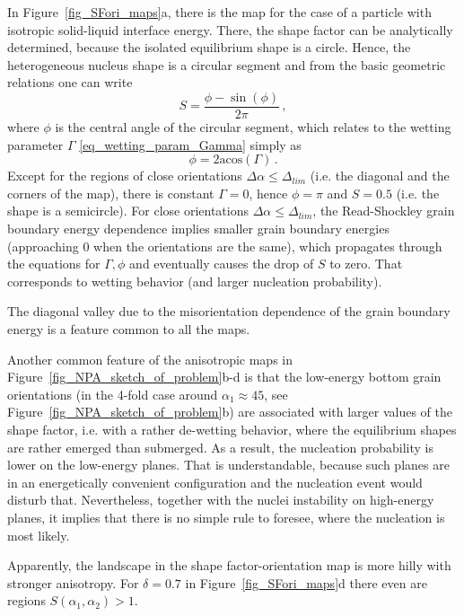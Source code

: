 	In Figure~\ref{fig_SFori_maps}a, there is the map for the case of a particle with isotropic solid-liquid interface energy. There, the shape factor can be analytically determined, because the isolated equilibrium shape is a circle. Hence, the heterogeneous nucleus shape is a circular segment and from the basic geometric relations one can write
	\begin{equation}
		S = \frac{\phi-\sin(\phi)}{2\pi} \,,
	\end{equation}
	where $\phi$ is the central angle of the circular segment, which relates to the wetting parameter $\Gamma$ \eqref{eq_wetting_param_Gamma} simply as
	\begin{equation}
		\phi = 2\mathrm{acos}(\Gamma) \,.
	\end{equation}
	Except for the regions of close orientations $\Delta\alpha\leq \Delta_{lim}$ (i.e. the diagonal and the corners of the map), there is constant $\Gamma=0$, hence $\phi = \pi$ and $S = 0.5$ (i.e. the shape is a semicircle). For close orientations $\Delta\alpha\leq \Delta_{lim}$, the Read-Shockley grain boundary energy dependence implies smaller grain boundary energies (approaching 0 when the orientations are the same), which propagates through the equations for $\Gamma,\phi$ and eventually causes the drop of $S$ to zero. That corresponds to wetting behavior (and larger nucleation probability).
	
	The diagonal valley due to the misorientation dependence of the grain boundary energy is a feature common to all the maps. 
	
	Another common feature of the anisotropic maps in Figure~\ref{fig_NPA_sketch_of_problem}b-d is that the low-energy bottom grain orientations (in the 4-fold case around $\alpha_1\approx 45$\textdegree, see Figure~\ref{fig_NPA_sketch_of_problem}b) are associated with larger values of the shape factor, i.e. with a rather de-wetting behavior, where the equilibrium shapes are rather emerged than submerged. As a result, the nucleation probability is lower on the low-energy planes. That is understandable, because such planes are in an energetically convenient configuration and the nucleation event would disturb that. Nevertheless, together with the nuclei instability on high-energy planes, it implies that there is no simple rule to foresee, where the nucleation is most likely.
	
	Apparently, the landscape in the shape factor-orientation map is more hilly with stronger anisotropy. For $\delta=0.7$ in Figure~\ref{fig_SFori_maps}d there even are regions $S(\alpha_1,\alpha_2)>1$. 
	
